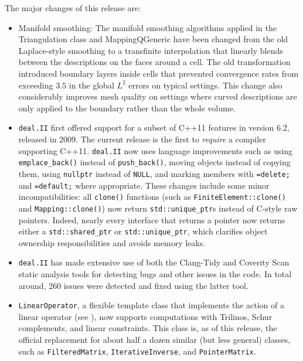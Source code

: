 \documentclass{ansarticle-preprint}
\newcommand{\specialword}[1]{\texttt{#1}}
\newcommand{\dealii}{{\specialword{deal.II}}}
\begin{document}
The major changes of this release are:
\begin{itemize}
\item
  Manifold smoothing: The manifold smoothing algorithms applied in the
  Triangulation class and MappingQGeneric have been changed from the old
  Laplace-style smoothing to a transfinite interpolation that linearly
  blends between the descriptions on the faces around a cell. The old
  transformation introduced boundary layers inside cells that prevented
  convergence rates from exceeding \(3.5\) in the global \(L^2\) errors on typical
  settings. This change also considerably improves mesh quality on settings
  where curved descriptions are only applied to the boundary rather than
  the whole volume.

\item
  \dealii{} first offered support for a subset of C++11 features in
  version 6.2, released in 2009. The current release is the first to \emph{require} a compiler
  supporting C++11. \dealii{} now uses language improvements such as using
  \texttt{emplace\_back()} instead of \texttt{push\_back()}, moving objects
  instead of copying them, using \texttt{nullptr} instead of \texttt{NULL}, and
  marking members with \texttt{=delete;} and \texttt{=default;} where
  appropriate. These changes include some minor incompatibilities: all
  \texttt{clone()} functions (such as \texttt{FiniteElement::clone()} and
  \texttt{Mapping::clone()}) now return \texttt{std::unique\_ptr}s instead of
  C-style raw pointers. Indeed, nearly every interface that returns a pointer
  now returns either a \texttt{std::shared\_ptr} or \texttt{std::unique\_ptr},
  which clarifies object ownership responsibilities and avoids memory leaks.

\item \dealii{} has made extensive use of both the Clang-Tidy \cite{clang-tidy}
  and Coverity Scan \cite{coverity} static analysis tools for detecting bugs
  and other issues in the code. In total around, 260 issues were detected and
  fixed using the latter tool.

\item
  \texttt{LinearOperator}, a flexible template class that implements the action of a
  linear operator (see \cite{MaierBardelloniHeltai-2016-b}), now supports
  computations with Trilinos, Schur complements, and linear constraints. This
  class is, as of this release, the official replacement for about half a dozen
  similar (but less general) classes, such as \texttt{FilteredMatrix},
  \texttt{IterativeInverse}, and \texttt{PointerMatrix}.


\end{itemize}
\end{document}
